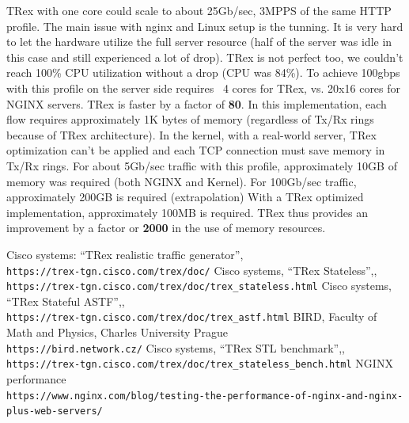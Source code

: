 \documentclass[conference]{IEEEtran}
\begin{document}
TRex with one core could scale to about 25Gb/sec, 3MPPS of the same HTTP profile.
The main issue with nginx and Linux setup is the tunning. 
It is very hard to let the hardware utilize the full server resource (half of the server was idle in this case and still experienced a lot of drop). 
TRex is not perfect too, we couldn't reach 100\% CPU utilization without a drop (CPU was 84\%). To achieve 100gbps with this profile on the server side requires ~4 cores for TRex, vs. 20x16 cores for NGINX servers. 
TRex is faster by a factor of \textbf{80}. In this implementation, each flow requires approximately 1K bytes of memory (regardless of Tx/Rx rings because of TRex architecture). 
In the kernel, with a real-world server, TRex optimization can't be applied and each TCP connection must save memory in Tx/Rx rings.
For about 5Gb/sec traffic with this profile, approximately 10GB of memory was required (both NGINX and Kernel). For 100Gb/sec traffic, approximately 200GB is required (extrapolation)  With a TRex optimized implementation, approximately 100MB is required. 
TRex thus provides an improvement by a factor or \textbf{2000} in the use of memory resources.



\begin{thebibliography}{00}
 Cisco systems: ``TRex realistic traffic generator'',\\\texttt{https://trex-tgn.cisco.com/trex/doc/}
 Cisco systems, ``TRex Stateless'',,\\\texttt{https://trex-tgn.cisco.com/trex/doc/trex\_stateless.html}
 Cisco systems, ``TRex Stateful ASTF'',,\\\texttt{https://trex-tgn.cisco.com/trex/doc/trex\_astf.html}
 BIRD, Faculty of Math and Physics, Charles University Prague \\\texttt{https://bird.network.cz/}
 Cisco systems, ``TRex STL benchmark'',,\\\texttt{https://trex-tgn.cisco.com/trex/doc/trex\_stateless\_bench.html}
 NGINX performance  \\\texttt{https://www.nginx.com/blog/testing-the-performance-of-nginx-and-nginx-plus-web-servers/}
\end{thebibliography}
\end{document}
